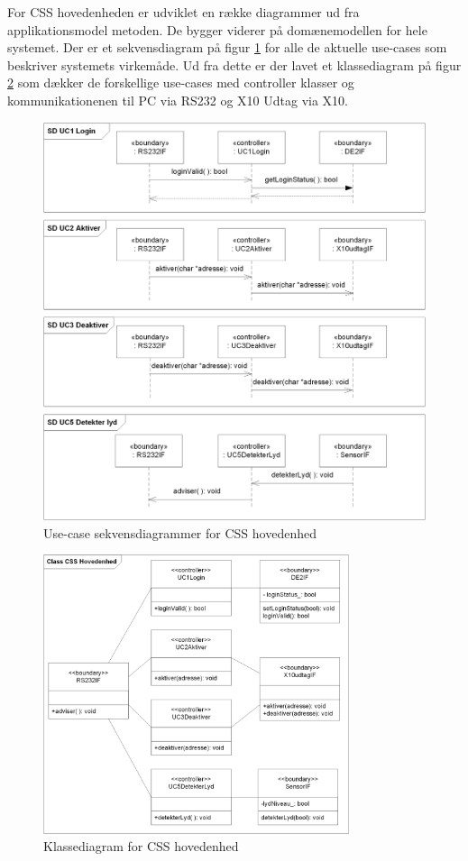For CSS hovedenheden er udviklet en række diagrammer ud fra applikationsmodel metoden. De bygger viderer på domænemodellen for hele systemet.
Der er et sekvensdiagram på figur \ref{fig:CSS_hovedenhed_SD} for alle de aktuelle use-cases som beskriver systemets virkemåde.
Ud fra dette er der lavet et klassediagram på figur \ref{fig:CSS_hovedenhed_Class} som dækker de forskellige use-cases med controller klasser og kommunikationenen til PC via RS232 og X10 Udtag via X10.


\begin{figure}[!htb]
	\includegraphics[width=\textwidth]{billeder/uml/CSS_hovedenhed_SD}
     \caption{Use-case sekvensdiagrammer for CSS hovedenhed}
     \label{fig:CSS_hovedenhed_SD}
\end{figure}

\begin{figure}[!htb] \centering
     \includegraphics[width=0.8\textwidth]{billeder/uml/CSS_hovedenhed_Class}
     \caption{Klassediagram for CSS hovedenhed}
     \label{fig:CSS_hovedenhed_Class}
\end{figure}

